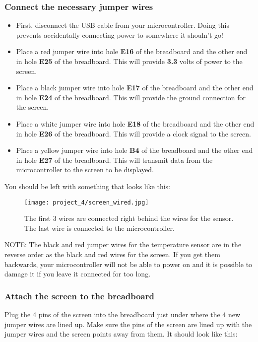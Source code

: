 \subsubsection{Connect the necessary jumper wires}
\begin{itemize}
    \item First, disconnect the USB cable from your microcontroller. Doing this prevents accidentally connecting power to somewhere it shouln't go!
    \item Place a red jumper wire into hole \textbf{E16} of the breadboard and the other end in
    hole \textbf{E25} of the breadboard. This will provide \textbf{3.3} volts of power to the screen.
    \item Place a black jumper wire into hole \textbf{E17} of the breadboard and the other end
    in hole \textbf{E24} of the breadboard. This will provide the ground connection for the screen.
    \item Place a white jumper wire into hole \textbf{E18} of the breadboard and the other end
    in hole \textbf{E26} of the breadboard. This will provide a clock signal to the screen.
    \item Place a yellow jumper wire into hole \textbf{B4} of the breadboard and the other
    end in hole \textbf{E27} of the breadboard. This will transmit data from the microcontroller to the screen to be displayed.
\end{itemize}

You should be left with something that looks like this:
\begin{figure}[H]
    \centering
    \texttt{[image: project\_4/screen\_wired.jpg]}
    \caption{The first 3 wires are connected right behind the wires for the sensor. The last wire is connected to the microcontroller.}
\end{figure}

\begin{tcolorbox}[colback=yellow!10!white,colframe=yellow!50!black]
    NOTE: The black and red jumper wires for the temperature sensor are in the reverse order as the
    black and red wires for the screen. If you get them backwards, your microcontroller will not be able
    to power on and it is possible to damage it if you leave it connected for too long.
\end{tcolorbox}

\subsubsection{Attach the screen to the breadboard}
Plug the 4 pins of the screen into the breadboard just under where the 4 new jumper wires are lined up. Make sure the pins of
the screen are lined up with the jumper wires and the screen points away from them. It should look like this:

